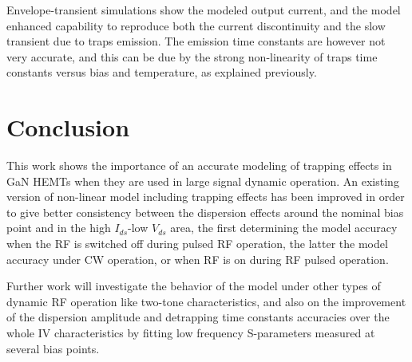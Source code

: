 \documentclass[conference]{IEEEtran}
\begin{document}
Envelope-transient simulations show the modeled output current, and the model enhanced capability to reproduce both the current discontinuity and the slow transient due to traps emission. The emission time constants are however not very accurate, and this can be due by the strong non-linearity of traps time constants versus bias and temperature, as explained previously.



\section{Conclusion}
This work shows the importance of an accurate modeling of trapping effects in GaN HEMTs when they are used in large signal dynamic operation. An existing version of non-linear model including trapping effects has been improved in order to give better consistency between the dispersion effects around the nominal bias point and in the high $I_{ds}$-low $V_{ds}$ area, the first determining the model accuracy when the RF is switched off during pulsed RF operation, the latter the model accuracy under CW operation, or when RF is on during RF pulsed operation.

Further work will investigate the behavior of the model under other types of dynamic RF operation like two-tone characteristics, and also on the improvement of the dispersion amplitude and detrapping time constants accuracies over the whole IV characteristics by fitting low frequency S-parameters measured at several bias points.








\end{document}

